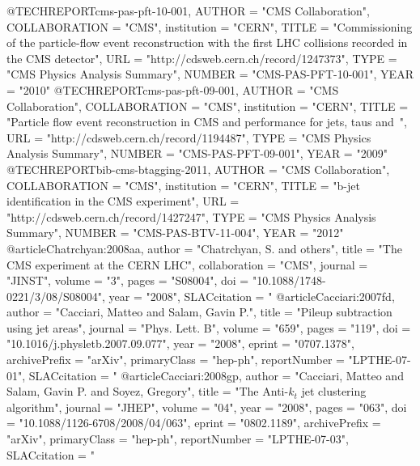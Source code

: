 @TECHREPORT{cms-pas-pft-10-001,
  AUTHOR      = "{CMS Collaboration}",
  COLLABORATION = "CMS",
  institution    = "CERN",
  TITLE       = "Commissioning of the particle-flow event reconstruction with
                 the first LHC collisions recorded in the CMS detector",
  URL         = "http://cdsweb.cern.ch/record/1247373",
  TYPE        = "CMS Physics Analysis Summary",
  NUMBER      = "CMS-PAS-PFT-10-001",
  YEAR        = "2010"
}
@TECHREPORT{cms-pas-pft-09-001,
  AUTHOR      = "{CMS Collaboration}",
  COLLABORATION = "CMS",
  institution    = "CERN",
  TITLE       = "Particle flow event reconstruction in {CMS} and performance
                 for jets, taus and~\MET",
  URL         = "http://cdsweb.cern.ch/record/1194487",
  TYPE        = "CMS Physics Analysis Summary",
  NUMBER      = "CMS-PAS-PFT-09-001",
  YEAR        = "2009"
}
@TECHREPORT{bib-cms-btagging-2011,
  AUTHOR      = "{CMS Collaboration}",
  COLLABORATION = "CMS",
  institution    = "CERN",
  TITLE       = "b-jet identification in the {CMS} experiment",
  URL         = "http://cdsweb.cern.ch/record/1427247",
  TYPE        = "CMS Physics Analysis Summary",
  NUMBER      = "CMS-PAS-BTV-11-004",
  YEAR        = "2012"
}
@article{Chatrchyan:2008aa,
      author         = "Chatrchyan, S. and others",
      title          = "{The {CMS} experiment at the {CERN} {LHC}}",
      collaboration  = "CMS",
      journal        = "JINST",
      volume         = "3",
      pages          = "S08004",
      doi            = "10.1088/1748-0221/3/08/S08004",
      year           = "2008",
      SLACcitation   = "%
}
@article{Cacciari:2007fd,
      author         = "Cacciari, Matteo and Salam, Gavin P.",
      title          = "{Pileup subtraction using jet areas}",
      journal        = "Phys. Lett. B",
      volume         = "659",
      pages          = "119",
      doi            = "10.1016/j.physletb.2007.09.077",
      year           = "2008",
      eprint         = "0707.1378",
      archivePrefix  = "arXiv",
      primaryClass   = "hep-ph",
      reportNumber   = "LPTHE-07-01",
      SLACcitation   = "%
}
@article{Cacciari:2008gp,
      author         = "Cacciari, Matteo and Salam, Gavin P. and Soyez, Gregory",
      title          = "{The Anti-$k_t$ jet clustering algorithm}",
      journal        = "JHEP",
      volume         = "04",
      year           = "2008",
      pages          = "063",
      doi            = "10.1088/1126-6708/2008/04/063",
      eprint         = "0802.1189",
      archivePrefix  = "arXiv",
      primaryClass   = "hep-ph",
      reportNumber   = "LPTHE-07-03",
      SLACcitation   = "%
}
